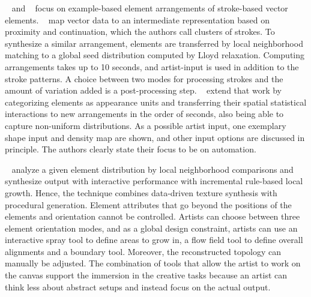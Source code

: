 \citeauthor*{barla_2006_spa}~\cite{barla_2006_spa} and \citeauthor*{hurtut_2009_ags}~\cite{hurtut_2009_ags} focus on example-based element arrangements of stroke-based vector elements. \citeauthor*{barla_2006_spa}~\cite{barla_2006_spa} map vector data to an intermediate representation based on proximity and continuation, which the authors call clusters of strokes. To synthesize a similar arrangement, elements are transferred by local neighborhood matching to a global seed distribution computed by Lloyd relaxation. Computing arrangements takes up to 10 seconds, and artist-input is used in addition to the stroke patterns. A choice between two modes for processing strokes and the amount of variation added is a post-processing step. \citeauthor*{hurtut_2009_ags}~\cite{hurtut_2009_ags} extend that work by categorizing elements as appearance units and transferring their spatial statistical interactions to new arrangements in the order of seconds, also being able to capture non-uniform distributions. As a possible artist input, one exemplary shape input and density map are shown, and other input options are discussed in principle. The authors clearly state their focus to be on automation.

\citeauthor*{ijiri_2008_aeb}~\cite{ijiri_2008_aeb} analyze a given element distribution by local neighborhood comparisons and synthesize output with interactive performance with incremental rule-based local growth. Hence, the technique combines data-driven texture synthesis with procedural generation. Element attributes that go beyond the positions of the elements and orientation cannot be controlled. Artists can choose between three element orientation modes, and as a global design constraint, artists can use an interactive spray tool to define areas to grow in, a flow field tool to define overall alignments and a boundary tool. Moreover, the reconstructed topology can manually be adjusted. The combination of tools that allow the artist to work on the canvas support the immersion in the creative tasks because an artist can think less about abstract setups and instead focus on the actual output.

